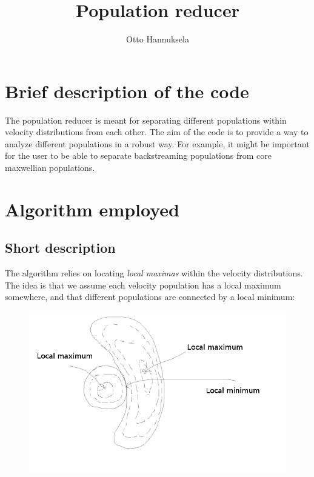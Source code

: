 \documentclass[a4paper,10pt]{article}
\title{Population reducer}
\author{Otto Hannuksela}
\begin{document}
\maketitle

\section{Brief description of the code}

The population reducer is meant for separating different populations within velocity distributions from each other. The aim of the code is to provide a way to analyze different populations 
in a robust way. For example, it might be important for the user to be able to separate backstreaming populations from core maxwellian populations.


\section{Algorithm employed}

\subsection{Short description}

The algorithm relies on locating \emph{local maximas} within the velocity distributions. The idea is that we assume each velocity population has a local maximum somewhere, and that 
different populations are connected by a local minimum:

\begin{figure}[H]
 \centering
 \includegraphics[width=\textwidth]{reducepopulation.png}
 \label{fig:populationcode}
\end{figure}
\end{document}
